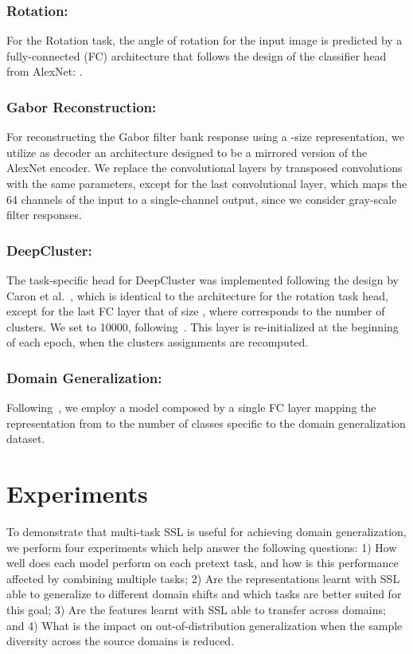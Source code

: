 \documentclass[runningheads]{llncs}
\begin{document}
\vspace{-5pt}\subsubsection{Rotation:} For the Rotation task, the angle of rotation for the input image is predicted by a fully-connected (FC) architecture that follows the design of the classifier head from AlexNet: . \vspace{-10pt}
\vspace{-5pt}\subsubsection{Gabor Reconstruction:} For reconstructing the Gabor filter bank response using a -size representation, we utilize as decoder an architecture designed to be a mirrored version of the AlexNet encoder. We replace the convolutional layers by transposed convolutions with the same parameters, except for the last convolutional layer, which maps the 64 channels of the input to a single-channel output, since we consider gray-scale filter responses.\vspace{-10pt}
\vspace{-5pt}\subsubsection{DeepCluster:} The task-specific head for DeepCluster was implemented following the design by Caron et al.~\cite{caron2018deep}, which is identical to the architecture for the rotation task head, except for the last FC layer that of size , where  corresponds to the number of clusters. We set  to 10000, following~\cite{caron2018deep}. This layer is re-initialized at the beginning of each epoch, when the clusters assignments are recomputed.\vspace{-10pt}
\vspace{-5pt}\subsubsection{Domain Generalization:} Following~\cite{kolesnikov2019revisiting}, we employ a model composed by a single FC layer mapping the representation from  to the number of classes specific to the domain generalization dataset. 

\section{Experiments}
To demonstrate that multi-task SSL is useful for achieving domain generalization, we perform four experiments which help answer the following questions: 1) How well does each model perform on each pretext task, and how is this performance affected by combining multiple tasks; 2) Are the representations learnt with SSL able to generalize to different domain shifts and which tasks are better suited for this goal; 3) Are the features learnt with SSL able to transfer across domains; and 4) What is the impact on out-of-distribution generalization when the sample diversity across the source domains is reduced. 
\end{document}

